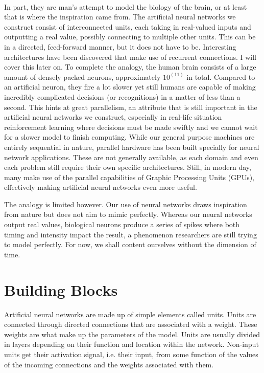 \paragraph{}
In part, they are man's attempt
to model the biology of the brain,
or at least that is where the inspiration came from.
The artificial neural networks we construct
consist of interconnected units,
each taking in real-valued inputs
and outputting a real value,
possibly connecting to multiple other units.
This can be in a directed, feed-forward manner,
but it does not have to be.
Interesting architectures have been discovered
that make use of recurrent connections.
I will cover this later on. %
To complete the analogy,
the human brain consists of a large amount of densely packed neurons,
approximately $10^(11)$ in total.
Compared to an artificial neuron,
they fire a lot slower
yet still humans are capable of
making incredibly complicated decisions
(or recognitions)
in a matter of less than a second.
This hints at great parallelism,
an attribute that is still important
in the artificial neural networks we construct,
especially in real-life situation reinforcement learning
where decisions must be made swiftly and we cannot wait
for a slower model to finish computing.
While our general purpose machines 
are entirely sequential in nature,
parallel hardware has been built specially
for neural network applications.
These are not generally available,
as each domain and even each problem
still require their own specific architectures.
Still, in modern day, many make use
of the parallel capabilities of
Graphic Processing Units (GPUs),
effectively making artificial neural networks even more useful.

The analogy is limited however.
Our use of neural networks draws inspiration from nature
but does not aim to mimic perfectly.
Whereas our neural networks output real values,
biological neurons produce a series of spikes
where both timing and intensity impact the result, %
a phenomenon researchers are still trying to model perfectly.
For now,
we shall content ourselves without the dimension of time.

\section{Building Blocks}
Artificial neural networks are made up of simple elements called units.
Units are connected through directed connections
that are associated with a weight.
These weights are what make up the parameters of the model.
Units are usually divided in layers depending on their function
and location within the network.
Non-input units get their activation signal, i.e. their input,
from some function of the values of the incoming connections
and the weights associated with them.

